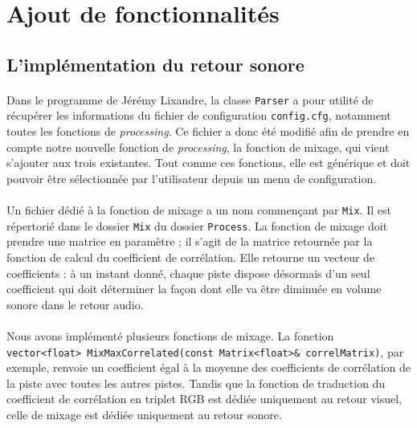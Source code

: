 \section{Ajout de fonctionnalités}

\subsection{L'implémentation du retour sonore}
\paragraph{}
Dans le programme de Jérémy Lixandre, la classe \verb!Parser! a pour
utilité de récupérer les informations du fichier de configuration
\verb!config.cfg!, notamment toutes les fonctions de
\textit{processing}. Ce fichier a donc été modifié afin de prendre en
compte notre nouvelle fonction de \textit{processing}, la fonction de
mixage, qui vient s'ajouter aux trois existantes. Tout comme ces
fonctions, elle est générique et doit pouvoir être sélectionnée par
l'utilisateur depuis un menu de configuration.

\paragraph{}
Un fichier dédié à la fonction de mixage a un nom commençant par
\verb!Mix!. Il est répertorié dans le dossier \verb!Mix! du dossier
\verb!Process!. La fonction de mixage doit prendre une matrice en
paramètre ; il s'agit de la matrice retournée par la fonction de
calcul du coefficient de corrélation. Elle retourne un vecteur de
coefficients : à un instant donné, chaque piste dispose désormais d'un
seul coefficient qui doit déterminer la façon dont elle va être
diminuée en volume sonore dans le retour audio.

\paragraph{}
Nous avons implémenté plusieurs fonctions de mixage. La fonction
\verb!vector<float> MixMaxCorrelated(const Matrix<float>& correlMatrix)!,
par exemple, renvoie un coefficient égal à la moyenne des coefficients
de corrélation de la piste avec toutes les autres pistes. Tandis que
la fonction de traduction du coefficient de corrélation en triplet RGB
est dédiée uniquement au retour visuel, celle de mixage est dédiée
uniquement au retour sonore.

